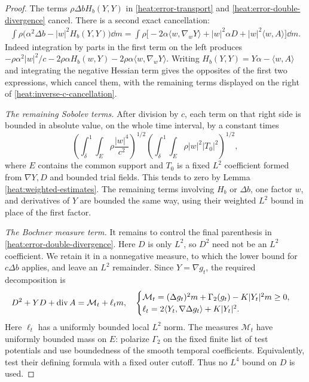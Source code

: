 \begin{proof}
The terms \(\rho\Delta b H_b(Y,Y)\) in
\eqref{heat:error-transport} and
\eqref{heat:error-double-divergence} cancel. There is a second
exact cancellation:
\begin{align}
\label{heat:inverse-c-cancellation}
\int\rho\bigl(\alpha^2\Delta b-|w|^2H_b(Y,Y)\bigr)\dd m
=\int\rho\bigl[
-2\alpha\langle w,\nabla_wY\rangle
+|w|^2\alpha D+|w|^2\langle w,A\rangle\bigr]\dd m.
\end{align}
Indeed integration by parts in the first term on the left
produces
\(-\rho\alpha^2|w|^2/c-2\rho\alpha H_b(w,Y)
-2\rho\alpha\langle w,\nabla_wY\rangle\).
Writing \(H_b(Y,Y)=Y\alpha-\langle w,A\rangle\) and
integrating the negative Hessian term gives the opposites of
the first two expressions, which cancel them, with the
remaining terms displayed on the right
of \eqref{heat:inverse-c-cancellation}.

\emph{The remaining Sobolev terms.}
After division by \(c\), each term on that right side is
bounded in absolute value, on the whole time interval, by a
constant times
\[
\left(\int_\delta^1\!\int_E
\rho\frac{|w|^4}{c^2}\right)^{1/2}
\left(\int_\delta^1\!\int_E
\rho|w|^2|T_0|^2\right)^{1/2},
\]
where \(E\) contains the common support and \(T_0\) is a fixed
\(L^2\) coefficient formed from \(\nabla Y,D\) and bounded
trial fields. This tends to zero by Lemma
\ref{heat:weighted-estimates}. The remaining terms involving
\(H_b\) or \(\Delta b\), one factor \(w\), and derivatives
of \(Y\) are bounded the same way, using their weighted
\(L^2\) bound in place of the first factor.

\emph{The Bochner measure term.}
It remains to control the final parenthesis in
\eqref{heat:error-double-divergence}. Here \(D\) is only \(L^2\),
so \(D^2\) need not be an \(L^2\) coefficient. We retain it in a
nonnegative measure, to which the lower bound for \(c\Delta b\)
applies, and leave an \(L^2\) remainder. Since \(Y=\nabla g_t\),
the required decomposition is
\begin{equation}
\label{heat:positive-measure-split}
D^2+YD+\operatorname{div} A=\mathcal M_t+\ell_t m,
\quad
\begin{cases}
\mathcal M_t=(\Delta g_t)^2m+\Gamma_2(g_t)-K|Y_t|^2m\ge0,\\
\ell_t=2\langle Y_t,\nabla\Delta g_t\rangle+K|Y_t|^2.
\end{cases}
\end{equation}
Here \(\ell_t\) has a uniformly bounded local \(L^2\) norm.
The measures \(\mathcal M_t\) have uniformly bounded mass
on \(E\): polarize \(\Gamma_2\) on the fixed finite list of
test potentials and use boundedness of the smooth temporal
coefficients. Equivalently, test their defining formula with
a fixed outer cutoff. Thus no \(L^4\) bound on \(D\) is used.


\end{proof}
